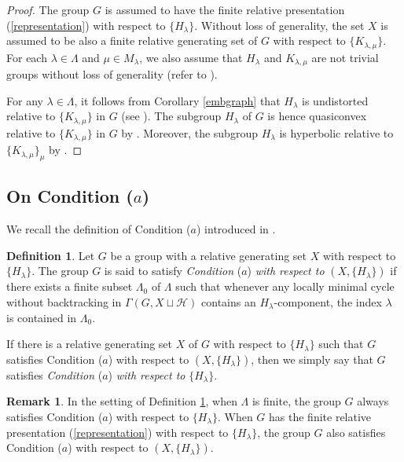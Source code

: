 \documentclass{amsart}
\theoremstyle{definition}
\newtheorem{Def}[Thm]{Definition}
\newtheorem{Rem}[Thm]{Remark}
\begin{document}
\begin{proof}
The group $G$ is assumed to have the finite relative presentation (\ref{representation}) with respect to $\{H_\lambda\}$. 
Without loss of generality, the set $X$ is assumed to be also a finite relative generating set of $G$ with respect to $\{K_{\lambda,\mu}\}$. 
For each $\lambda\in\Lambda$ and $\mu \in M_\lambda$, we also assume that $H_\lambda$ and $K_{\lambda,\mu}$ are not trivial groups without loss of generality (refer to \cite[Remark 2.2]{M-O-Y1}). 

For any $\lambda\in \Lambda$, it follows from Corollary \ref{embgraph} that $H_\lambda$ is undistorted relative to $\{K_{\lambda,\mu}\}$ in $G$ (see \cite[Definition 4.13]{M-O-Y1}). 
The subgroup $H_\lambda$ of $G$ is hence quasiconvex relative to $\{K_{\lambda,\mu}\}$ in $G$ by \cite[Theorem 1.4 (i)]{M-O-Y1}. 
Moreover, the subgroup $H_\lambda$ is hyperbolic relative to $\{K_{\lambda,\mu}\}_\mu$ by \cite[Theorem 4.25]{M-O-Y1}. 
\end{proof}

\subsection{On Condition ($a$)}

We recall the definition of Condition ($a$) introduced in \cite[Definition 2.11]{M-O-Y1}. 

\begin{Def}\label{*}
Let $G$ be a group with a relative generating set $X$ with respect to $\{H_\lambda\}$. 
The group $G$ is said to satisfy {\it Condition} ($a$) {\it with respect to} $(X, \{H_\lambda\})$ if there exists a finite subset $\Lambda_0$ of $\Lambda$ such that whenever any locally minimal cycle without backtracking in $\Gamma(G,X\sqcup{\mathcal H})$ contains an $H_\lambda$-component, the index $\lambda$ is contained in $\Lambda_0$. 
 
If there is a relative generating set $X$ of $G$ with respect to $\{H_\lambda\}$ such that $G$ satisfies Condition ($a$) with respect to $(X,\{H_\lambda\})$, then we simply say that $G$ satisfies {\it Condition} ($a$) {\it with respect to} $\{H_\lambda\}$. 
\end{Def}

\begin{Rem}\label{rem*}
In the setting of Definition \ref{*}, when $\Lambda$ is finite, the group $G$ always satisfies Condition ($a$) with respect to $\{H_\lambda\}$. 
When $G$ has the finite relative presentation (\ref{representation}) with respect to $\{H_\lambda\}$, the group $G$ also satisfies Condition ($a$) with respect to $(X,\{H_\lambda\})$. 
\end{Rem}
\end{document}
